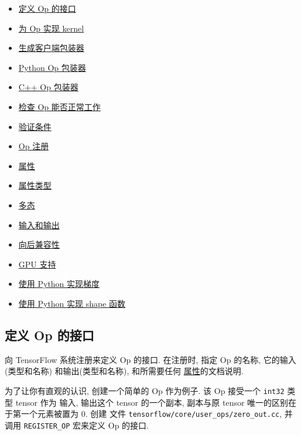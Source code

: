 \begin{itemize}
\tightlist
\item
  \protect\hyperlink{defineux5finterface}{定义 Op 的接口}
\item
  \protect\hyperlink{AUTOGENERATED-implement-the-kernel-for-the-op}{为
  Op 实现 kernel}
\item
  \protect\hyperlink{AUTOGENERATED-generate-the-client-wrapper}{生成客户端包装器}
\item
  \protect\hyperlink{AUTOGENERATED-the-python-op-wrapper}{Python Op
  包装器}
\item
  \protect\hyperlink{AUTOGENERATED-the-c---op-wrapper}{C++ Op 包装器}
\item
  \protect\hyperlink{AUTOGENERATED-verify-it-works}{检查 Op
  能否正常工作}
\item
  \protect\hyperlink{Validation}{验证条件}
\item
  \protect\hyperlink{AUTOGENERATED-op-registration}{Op 注册}
\item
  \protect\hyperlink{Attrs}{属性}
\item
  \protect\hyperlink{AUTOGENERATED-attr-types}{属性类型}
\item
  \protect\hyperlink{Polymorphism}{多态}
\item
  \protect\hyperlink{AUTOGENERATED-inputs-and-outputs}{输入和输出}
\item
  \protect\hyperlink{AUTOGENERATED-backwards-compatibility}{向后兼容性}
\item
  \protect\hyperlink{mult-archs}{GPU 支持}
\item
  \protect\hyperlink{AUTOGENERATED-implement-the-gradient-in-python}{使用
  Python 实现梯度}
\item
  \protect\hyperlink{AUTOGENERATED-implement-a-shape-function-in-python}{使用
  Python 实现 shape 函数}
\end{itemize}

\subsection{定义 Op 的接口 }\label{ux5b9aux4e49-op-ux7684ux63a5ux53e3}

向 TensorFlow 系统注册来定义 Op 的接口. 在注册时, 指定 Op 的名称,
它的输入(类型和名称) 和输出(类型和名称), 和所需要任何
\protect\hyperlink{Attrs}{属性}的文档说明.

为了让你有直观的认识, 创建一个简单的 Op 作为例子. 该 Op 接受一个
\texttt{int32} 类型 tensor 作为 输入, 输出这个 tensor 的一个副本,
副本与原 tensor 唯一的区别在于第一个元素被置为 0. 创建 文件
\texttt{tensorflow/core/user\_ops/zero\_out.cc}, 并调用
\texttt{REGISTER\_OP} 宏来定义 Op 的接口.

